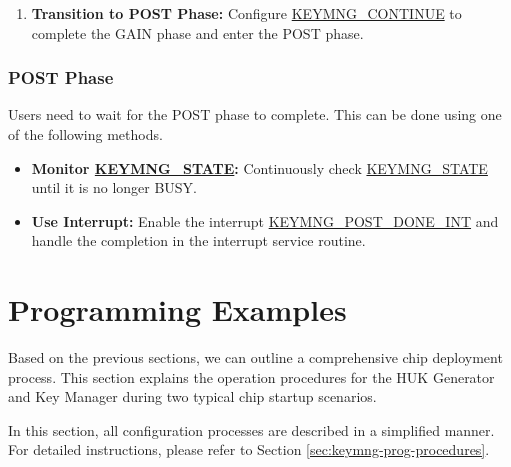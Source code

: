 \documentclass[main\_\_EN.tex]{subfiles}
\begin{document}
\begin{enumerate}
\begin{itemize}
\begin{enumerate}
        \end{enumerate}
        \item \textbf{Private Key Recovery Mode:} no need to read any information.
        \item \textbf{\hyperref[para:keyinfo]{\begin{math}key\_info\end{math}} Export Mode:}
        \begin{enumerate}
            \item Read \hyperref[para:keyinfo]{\begin{math}key\_info\end{math}} (512 bits) from \hyperref[mem:keymng-public-info]{KEYMNG\_PUBLIC\_INFO\_MEM}.
        \end{enumerate}
    \end{itemize}
    \item \textbf{Transition to POST Phase:} Configure \hyperref[fielddesc:KEYMNGCONTINUE]{KEYMNG\_CONTINUE} to complete the GAIN phase and enter the POST phase.
\end{enumerate}


\subsubsection{POST Phase}
Users need to wait for the POST phase to complete. This can be done using one of the following methods.
\begin{itemize}
    \item \textbf{Monitor \hyperref[fielddesc:KEYMNGSTATE]{KEYMNG\_STATE}:} Continuously check \hyperref[fielddesc:KEYMNGSTATE]{KEYMNG\_STATE} until it is no longer BUSY.
    \item \textbf{Use Interrupt:} Enable the interrupt \hyperref[int:KEYMNGPOSTDONEINT]{KEYMNG\_POST\_DONE\_INT} and handle the completion in the interrupt service routine.
\end{itemize}



\section{Programming Examples}

Based on the previous sections, we can outline a comprehensive chip deployment process. This section explains the operation procedures for the HUK Generator and Key Manager during two typical chip startup scenarios.


\vspace{-0.5em}
\begin{tiplisting}
In this section, all configuration processes are described in a simplified manner. For detailed instructions, please refer to Section \ref{sec:keymng-prog-procedures}.
\end{tiplisting}
\end{document}
